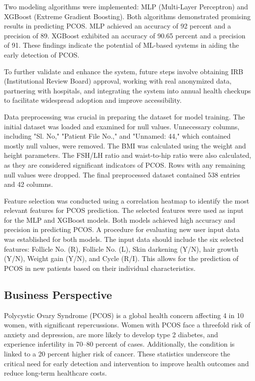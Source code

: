 \documentclass{article}
\begin{document}
Two modeling algorithms were implemented: MLP (Multi-Layer Perceptron) and XGBoost (Extreme Gradient Boosting). Both algorithms demonstrated promising results in predicting PCOS. MLP achieved an accuracy of 92 percent and a precision of 89. XGBoost exhibited an accuracy of 90.65 percent and a precision of 91. These findings indicate the potential of ML-based systems in aiding the early detection of PCOS.

To further validate and enhance the system, future steps involve obtaining IRB (Institutional Review Board) approval, working with real anonymized data, partnering with hospitals, and integrating the system into annual health checkups to facilitate widespread adoption and improve accessibility.

Data preprocessing was crucial in preparing the dataset for model training. The initial dataset was loaded and examined for null values. Unnecessary columns, including "Sl. No," "Patient File No.," and "Unnamed: 44," which contained mostly null values, were removed. The BMI was calculated using the weight and height parameters. The FSH/LH ratio and waist-to-hip ratio were also calculated, as they are considered significant indicators of PCOS. Rows with any remaining null values were dropped. The final preprocessed dataset contained 538 entries and 42 columns.

Feature selection was conducted using a correlation heatmap to identify the most relevant features for PCOS prediction. The selected features were used as input for the MLP and XGBoost models. Both models achieved high accuracy and precision in predicting PCOS. A procedure for evaluating new user input data was established for both models. The input data should include the six selected features: Follicle No. (R), Follicle No. (L), Skin darkening (Y/N), hair growth (Y/N), Weight gain (Y/N), and Cycle (R/I). This allows for the prediction of PCOS in new patients based on their individual characteristics.

\subsection{Business Perspective}

 

Polycystic Ovary Syndrome (PCOS) is a global health concern affecting 4 in 10 women, with significant repercussions. Women with PCOS face a threefold risk of anxiety and depression, are more likely to develop type 2 diabetes, and experience infertility in 70–80 percent of cases. Additionally, the condition is linked to a 20 percent higher risk of cancer. These statistics underscore the critical need for early detection and intervention to improve health outcomes and reduce long-term healthcare costs.
\end{document}
